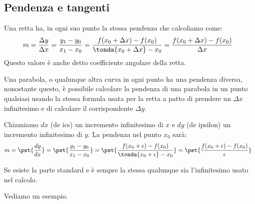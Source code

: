 \subsection{Pendenza e tangenti}
\label{subsec:insnum_tangenti_parabola}


Una retta ha, in ogni suo punto la stessa pendenza che calcoliamo come:
\[m=\dfrac{\Delta y}{\Delta x}=\dfrac{y_1-y_0}{x_1-x_0}=
\dfrac{f(x_0+\Delta x)-f(x_0)}{\tonda{x_0+\Delta x}-x_0}=
\dfrac{f(x_0+\Delta x)-f(x_0)}{\Delta x}\]
Questo valore è anche detto coefficiente angolare della retta.

Una parabola, o qualunque altra curva in ogni punto ha una pendenza 
diversa, nonostante questo, è possibile calcolare la pendenza di una 
parabola in un punto qualsiasi usando la stessa formula usata per la retta 
a patto di prendere un \(\Delta x\) infinitesimo e di calcolare il 
corrispondente \(\Delta y\).

Chiamiamo \(d x\) (de ics) un incremento infinitesimo di \(x\) e 
\(d y\) (de ipsilon) un incremento infinitesimo di \(y\).
La pendenza nel punto \(x_0\) sarà:
\[m=\pst{\dfrac{d y}{d x}}=\pst{\dfrac{y_1-y_0}{x_1-x_0}}=
    \pst{\dfrac{f(x_0+\epsilon)-f(x_0)}{\tonda{x_0+\epsilon}-x_0}}=
    \pst{\dfrac{f(x_0+\epsilon)-f(x_0)}{\epsilon}}\]

Se esiste la parte standard e è sempre la stessa qualunque sia l'infinitesimo 
usato nel calcolo.


Vediamo un esempio.

